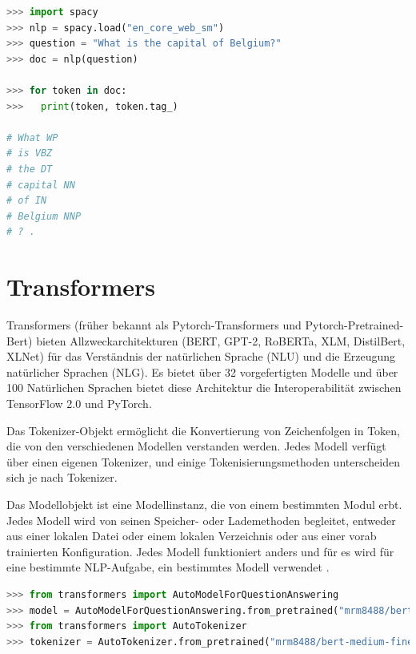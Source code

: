 \documentclass[
        ngerman,
        paper=a4,
        numbers=noendperiod,
]{scrreprt}
\begin{document}
\begin{lstlisting}[language=Python, caption=Spacy Beispiel]
>>> import spacy
>>> nlp = spacy.load("en_core_web_sm")
>>> question = "What is the capital of Belgium?"
>>> doc = nlp(question)

>>> for token in doc:
>>>   print(token, token.tag_)

# What WP                                    
# is VBZ                                     
# the DT                                     
# capital NN            
# of IN
# Belgium NNP
# ? .

\end{lstlisting}

\section{Transformers}
Transformers (früher bekannt als Pytorch-Transformers und Pytorch-Pretrained-Bert) bieten Allzweckarchitekturen (BERT, GPT-2, RoBERTa, XLM, DistilBert, XLNet) für das Verständnis der natürlichen Sprache (NLU) und die Erzeugung natürlicher Sprachen (NLG). Es bietet über 32 vorgefertigten Modelle und über 100 Natürlichen Sprachen bietet diese Architektur die Interoperabilität zwischen TensorFlow 2.0 und PyTorch.

Das Tokenizer-Objekt ermöglicht die Konvertierung von Zeichenfolgen in Token, die von den verschiedenen Modellen verstanden werden. Jedes Modell verfügt über einen eigenen Tokenizer, und einige Tokenisierungsmethoden unterscheiden sich je nach Tokenizer.

Das Modellobjekt ist eine Modellinstanz, die von einem bestimmten Modul erbt. Jedes Modell wird von seinen Speicher- oder Lademethoden begleitet, entweder aus einer lokalen Datei oder einem lokalen Verzeichnis oder aus einer vorab trainierten Konfiguration. Jedes Modell funktioniert anders und für es wird für eine bestimmte NLP-Aufgabe, ein bestimmtes Modell verwendet \citep{TransformersDocumentation}\citep{PyTorch-TransformersPyTorch}.

\begin{lstlisting}[language=Python, caption=Transformers Beispiel]
>>> from transformers import AutoModelForQuestionAnswering
>>> model = AutoModelForQuestionAnswering.from_pretrained("mrm8488/bert-medium-finetuned-squadv2")
>>> from transformers import AutoTokenizer
>>> tokenizer = AutoTokenizer.from_pretrained("mrm8488/bert-medium-finetuned-squadv2")
\end{lstlisting}
\end{document}
